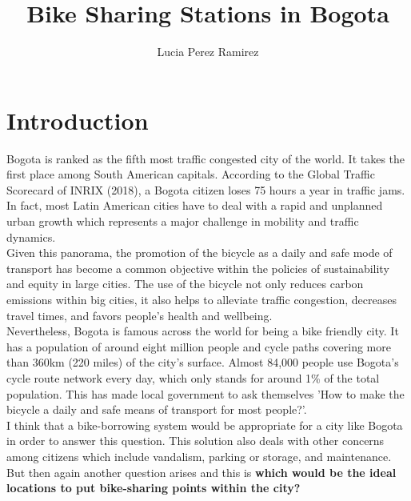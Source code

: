 \documentclass[11pt]{article}
\title{\textbf{Bike Sharing Stations in Bogota}}
\author{Lucia Perez Ramirez}
\date{}                                           %
\begin{document}
\maketitle
\section{Introduction}
Bogota is ranked as the fifth most traffic congested city of the world. It takes the first place among South American capitals. According to the Global Traffic Scorecard of INRIX (2018), a Bogota citizen loses 75 hours a year in traffic jams. In fact, most Latin American cities have to deal with a rapid and unplanned urban growth which represents a major challenge in mobility and traffic dynamics.\\

Given this panorama, the promotion of the bicycle as a daily and safe mode of transport has become a common objective within the policies of sustainability and equity in large cities. The use of the bicycle not only reduces carbon emissions within big cities, it also helps to alleviate traffic congestion, decreases travel times, and favors people's health and wellbeing.\\

Nevertheless, Bogota is famous across the world for being a bike friendly city. It has a population of around eight million people and cycle paths covering more than 360km (220 miles) of the city’s surface. Almost 84,000 people use Bogota’s cycle route network every day, which only stands for around 1\% of the total population. This has made local government to ask themselves 'How to make the bicycle a daily and safe means of transport for most people?'.\\

I think that a bike-borrowing system would be appropriate for a city like Bogota in order to answer this question. This solution also deals with other concerns among citizens which include vandalism, parking or storage, and maintenance.\\

But then again another question arises and this is \textbf{which would be the ideal locations to put bike-sharing points within the city?}
\end{document}
